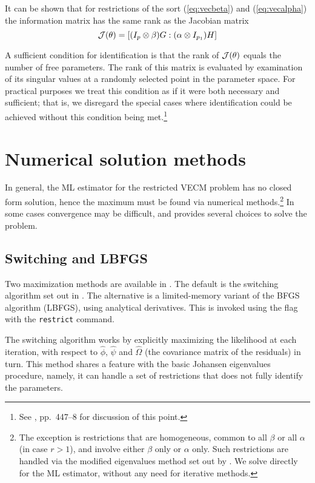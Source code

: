 It can be shown that for restrictions of the sort (\ref{eq:vecbeta})
and (\ref{eq:vecalpha}) the information matrix has the same rank as the
Jacobian matrix
%
\[
{\cal J}(\theta) = \left[ (I_p \otimes \beta) G : 
                   (\alpha \otimes I_{p_1}) H \right]
\]

A sufficient condition for identification is that the rank of ${\cal
  J}(\theta)$ equals the number of free parameters.  The rank of this
matrix is evaluated by examination of its singular values at a
randomly selected point in the parameter space.  For practical
purposes we treat this condition as if it were both necessary and
sufficient; that is, we disregard the special cases where
identification could be achieved without this condition being
met.\footnote{See \cite{boswijk-doornik04}, pp.\ 447--8 for
  discussion of this point.}


\section{Numerical solution methods}
\label{sec:vecm-opt}

In general, the ML estimator for the restricted VECM problem has no
closed form solution, hence the maximum must be found via numerical
methods.\footnote{The exception is restrictions that are homogeneous,
  common to all $\beta$ or all $\alpha$ (in case $r>1$), and involve
  either $\beta$ only or $\alpha$ only.  Such restrictions are handled
  via the modified eigenvalues method set out by \cite{johansen95}.
  We solve directly for the ML estimator, without any need for
  iterative methods.}  In some cases convergence may be difficult, and
 provides several choices to solve the problem.

\subsection{Switching and LBFGS}
\label{sec:vecm-algorithms}

Two maximization methods are available in . The default is
the switching algorithm set out in \cite{boswijk-doornik04}.  The
alternative is a limited-memory variant of the BFGS algorithm (LBFGS),
using analytical derivatives.  This is invoked using the
 flag with the \texttt{restrict} command.

The switching algorithm works by explicitly maximizing the likelihood
at each iteration, with respect to $\hat{\phi}$, $\hat{\psi}$ and
$\hat{\Omega}$ (the covariance matrix of the residuals) in turn.  This
method shares a feature with the basic Johansen eigenvalues procedure,
namely, it can handle a set of restrictions that does not fully
identify the parameters.

